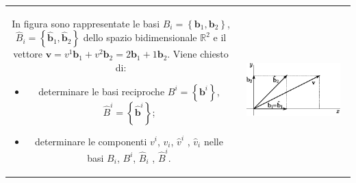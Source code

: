 % 
%
\vspace{30pt}
\noindent
\begin{tabular}{cc}
\begin{minipage}{0.60\textwidth}
\begin{exercise}\label{exa:basis}
In figura %
 sono rappresentate le basi $B_i=\left\{ \bm{b}_1 , \bm{b}_2 \right\}$, 
 $\hat{B}_i = \left\{ \bm{\hat{b}}_1 , \bm{\hat{b}}_2 \right\}$ dello spazio bidimensionale
 $\mathbb{R}^2$ e il vettore $\bm{v} = v^1 \bm{b}_1 + v^2 \bm{b}_2 = 2 \bm{b}_1 + 1 \bm{b}_2$.
Viene chiesto di:
\begin{itemize}
 \item determinare le basi reciproche $B^i = \left\{ \bm{b}^i \right\}$, $\hat{B}^i = \left\{ \bm{\hat{b}}^i \right\}$;
 \item determinare le componenti $v^i$, $v_i$, $\hat{v}^i$ , $\hat{v}_i$ nelle basi $B_i$, $B^i$, $\hat{B}_i$ , $\hat{B}^i$.
\end{itemize}
\end{exercise}
\end{minipage}
&
\begin{minipage}{0.40\textwidth}
\begin{center}%
   \includegraphics[width=0.90\textwidth]{./fig/ese_basis1.eps}
\end{center}
\end{minipage}
\end{tabular}


